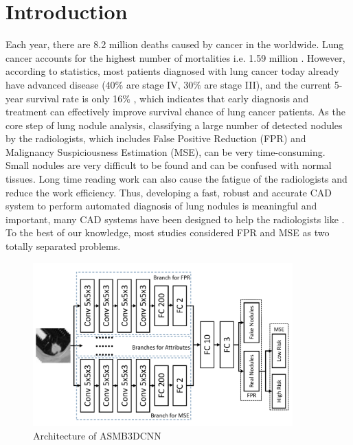\documentclass[runningheads]{llncs}
\begin{document}
\section{Introduction}
Each year, there are 8.2 million deaths caused by cancer in the worldwide. Lung cancer accounts for the highest number of mortalities i.e. 1.59 million \cite{Wild2014International}. However, according to statistics, most patients diagnosed with lung cancer today already have advanced disease (40\% are stage IV, 30\% are stage III), and the current 5-year survival rate is only 16\% \cite{Bach2012Benefits}, which indicates that early diagnosis and treatment can effectively improve survival chance of lung cancer patients. As the core step of lung nodule analysis, classifying a large number of detected nodules by the radiologists, which includes False Positive Reduction (FPR) and Malignancy Suspiciousness Estimation (MSE), can be very time-consuming. Small nodules are very difficult to be found and can be confused with normal tissues. Long time reading work can also cause the fatigue of the radiologists and reduce the work efficiency. Thus, developing a fast, robust and accurate CAD system to perform automated diagnosis of lung nodules is meaningful and important\cite{Greenspan2016Guest}, many CAD systems have been designed to help the radiologists like \cite{rajpurkar2017chexnet} \cite{wang2018tienet} \cite{Causey2018Highly} \cite{nanwu2019dnn}. To the best of our knowledge, most studies considered FPR and MSE as two totally separated problems.

\begin{figure}[t]
\centerline{\includegraphics[width=100mm]{fig1.pdf}}
\vspace{-0.0cm}
\caption{Architecture of ASMB3DCNN}
\vspace{-0.5cm}
\label{fig1}
\end{figure}
\end{document}
